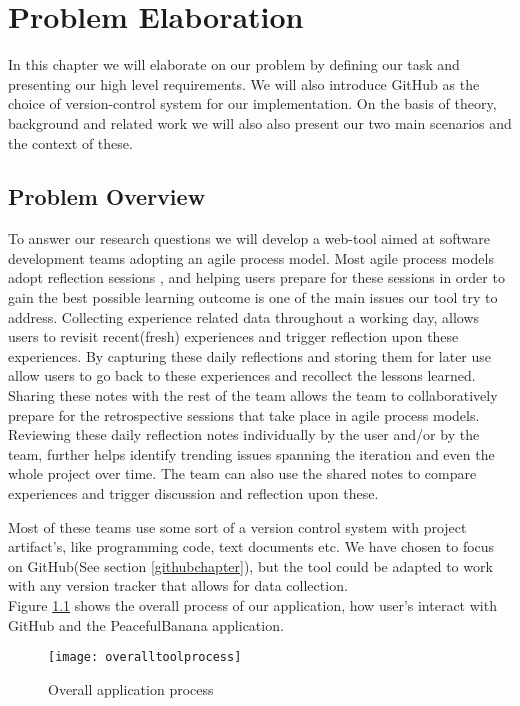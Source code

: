 \chapter{Problem Elaboration}
\label{chap:problemelaboration}
\label{problemelaboration}
In this chapter we will elaborate on our problem by defining our task and presenting our high level requirements. We will also introduce GitHub as the choice of version-control system for our implementation.
On the basis of theory, background and related work we will also also present our two main scenarios and the context of these. 

\section{Problem Overview}
\label{problemdefinition}

To answer our research questions we will develop a web-tool aimed at software development teams adopting an agile process model. Most agile process models adopt reflection sessions \citep{retrospectivedzone}, and helping users prepare for these sessions in order to gain the best possible learning outcome is one of the main issues our tool try to address. Collecting experience related data throughout a working day, allows users to revisit recent(fresh) experiences and trigger reflection upon these experiences. By capturing these daily reflections and storing them for later use allow users to go back to these experiences and recollect the lessons learned. Sharing these notes with the rest of the team allows the team to collaboratively prepare for the retrospective sessions that take place in agile process models. Reviewing these daily reflection notes individually by the user and/or by the team, further helps identify trending issues spanning the iteration and even the whole project over time. The team can also use the shared notes to compare experiences and trigger discussion and reflection upon these. 

Most of these teams use some sort of a version control system with project artifact's, like programming code, text documents etc. We have chosen to focus on GitHub(See section \ref{githubchapter}), but the tool could be adapted to work with any version tracker that allows for data collection. \\
Figure \ref{overalltoolprocess} shows the overall process of our application, how user's interact with GitHub and the PeacefulBanana application. 

\begin{figure}[H]
\centering
	\texttt{[image: overalltoolprocess]}
\caption{Overall application process}
\label{overalltoolprocess}
\end{figure}


